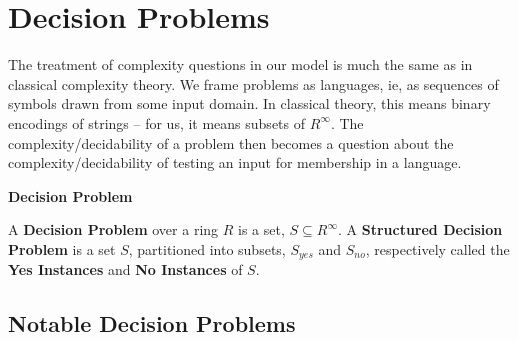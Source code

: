   
  \section{Decision Problems}

  The treatment of complexity questions in our model is much the same
  as in classical complexity theory.  We frame problems as languages,
  ie, as sequences of symbols drawn from some input domain.  In
  classical theory, this means binary encodings of strings -- for us,
  it means subsets of $R^\infty$.  The complexity/decidability of a
  problem then becomes a question about the complexity/decidability of
  testing an input for membership in a language.

  \begin{definition}{\textbf{Decision Problem}}
      
    A \textbf{Decision Problem} over a ring $R$ is a set, $S \subseteq
    R^\infty$.  A \textbf{Structured Decision Problem} is a set $S$,
    partitioned into subsets, $S_{yes}$ and $S_{no}$, respectively
    called the \textbf{Yes Instances} and \textbf{No Instances} of
    $S$.
 
  \end{definition}

  \subsection{Notable Decision Problems}
  

